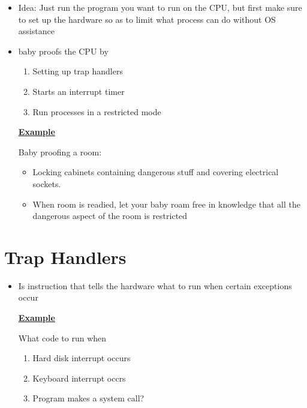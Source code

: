 \documentclass[12pt]{article}
\begin{document}
\begin{itemize}
    \item Idea: Just run the program you want to run on the CPU,
    but first make sure to set up the hardware so as to limit what
    process can do without OS assistance
    \item baby proofs the CPU by

    \bigskip

    \begin{enumerate}[1.]
        \item Setting up trap handlers
        \item Starts an interrupt timer
        \item Run processes in a restricted mode
    \end{enumerate}

    \bigskip

    \underline{\textbf{Example}}

    \bigskip

    Baby proofing a room:

    \bigskip

    \begin{itemize}
        \item Locking cabinets containing dangerous stuff and covering electrical sockets.
        \item When room is readied, let your baby roam free in knowledge that all the dangerous
        aspect of the room is restricted
    \end{itemize}
\end{itemize}

\section{Trap Handlers}

\begin{itemize}
    \item Is instruction that tells the hardware what to run when certain exceptions occur

    \bigskip

    \underline{\textbf{Example}}

    \bigskip

    What code to run when

    \begin{enumerate}[1.]
        \item Hard disk interrupt occurs
        \item Keyboard interrupt occrs
        \item Program makes a system call?
    \end{enumerate}

\end{itemize}
\end{document}
